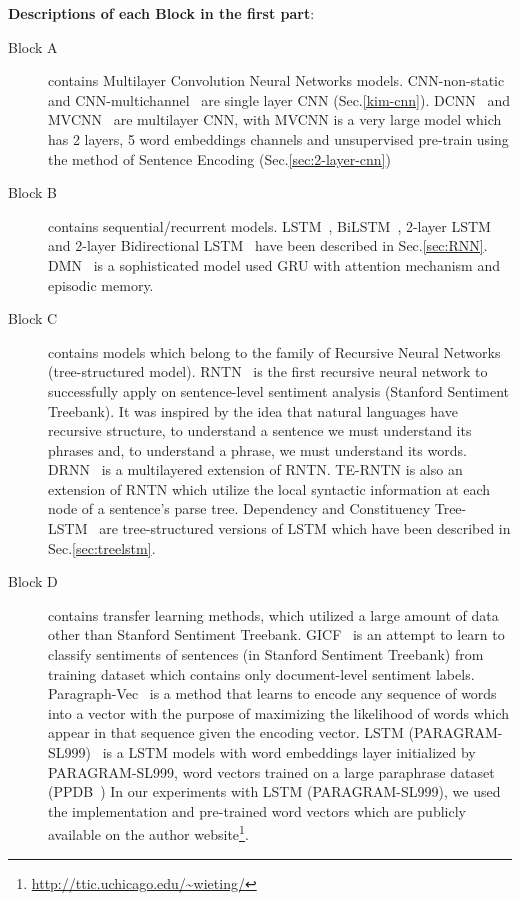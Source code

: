 \textbf{Descriptions of each Block in the first part}:
\begin{description}
\item[Block A] contains Multilayer Convolution Neural Networks models.
CNN-non-static and CNN-multichannel~\cite{KimCNN} are single layer CNN (Sec.\ref{kim-cnn}).
DCNN~\cite{DCNN} and MVCNN~\cite{2-layer-cnn} are multilayer CNN, with MVCNN is a very large model  which has 2 layers, 5 word embeddings channels and unsupervised pre-train using the method of Sentence Encoding (Sec.\ref{sec:2-layer-cnn})
\item[Block B] contains sequential/recurrent models.
 LSTM~\cite{originLSTM}, BiLSTM~\cite{GravesLSTM}, 2-layer LSTM~\cite{GravesLSTM} and 2-layer Bidirectional LSTM~\cite{GravesLSTM} have been described in Sec.\ref{sec:RNN}.
DMN~\cite{attention-gru} is a sophisticated model used GRU with attention mechanism and episodic memory.
\item[Block C] contains models which belong to the family of Recursive Neural Networks (tree-structured model).
RNTN~\cite{socher2013recursive} is the first recursive neural network to successfully apply on sentence-level sentiment analysis (Stanford Sentiment Treebank).
It was inspired by the idea that natural languages have recursive structure, to understand a sentence we must understand its phrases and, to understand a phrase, we must understand its words.
DRNN~\cite{IrsoyDRNN} is a multilayered extension of RNTN.
TE-RNTN is also an extension of RNTN which utilize the local syntactic information at each node of a sentence's parse tree.
Dependency and Constituency Tree-LSTM~\cite{treeLSTM} are tree-structured versions of LSTM which have been described in Sec.\ref{sec:treelstm}.

\item[Block D] contains transfer learning methods, which utilized a large amount of data other than Stanford Sentiment Treebank.
GICF~\cite{group-instance} is an attempt to learn to classify sentiments of sentences (in Stanford Sentiment Treebank) from training dataset which contains only document-level sentiment labels.
Paragraph-Vec~\cite{ParagraphVec} is a method that learns to encode any sequence of words into a vector with the purpose of maximizing the likelihood of words which appear in that sequence given the encoding vector.
LSTM (PARAGRAM-SL999)~\cite{wieting2015towards} is a LSTM models with word embeddings layer initialized by PARAGRAM-SL999, word vectors trained on a large paraphrase dataset (PPDB~\cite{ganitkevitch2013ppdb}) %
In our experiments with LSTM (PARAGRAM-SL999), we used the implementation and pre-trained word vectors which are publicly available on the author website\footnote{\url{http://ttic.uchicago.edu/~wieting/}}.


\end{description}
